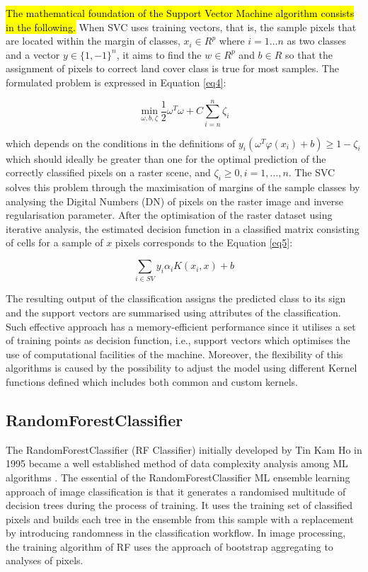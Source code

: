 \documentclass[final,5p,times,twocolumn]{elsarticle}
\begin{document}
\hl{The mathematical foundation of the Support Vector Machine algorithm consists in the following. }When SVC uses training vectors, that is, the sample pixels that are located within the margin of classes,
$x_{i} \in R^p$ where $ i=1 \dots n$ as two classes and a vector $y \in \{1, - 1\}^n$, it aims to find the $w \in R^p$ and $b \in R$ so that the assignment of pixels to correct land cover class is true for most samples. The formulated problem is expressed in Equation \ref{eq4}:

\begin{equation}
\min_{\omega,b,\zeta}\frac{1}{2}\omega^T\omega+C\sum_{i=n}^{n}\zeta_{i}
\label{eq4}
\end{equation}

which depends on the conditions in the definitions of $y_{i}(\omega^{T}\varphi (x_i) + b)\geq 1-\zeta_{i}$ which should ideally be greater than one for the optimal prediction of the correctly classified pixels on a raster scene, and $\zeta_{i}\geq 0, i = 1,\dots,n$. The SVC solves this problem through the maximisation of margins of the sample classes by analysing the Digital Numbers (DN) of pixels on the raster image and inverse regularisation parameter. After the optimisation of the raster dataset using iterative analysis, the estimated decision function in a classified matrix consisting of cells for a sample of $x$ pixels corresponds to the Equation \ref{eq5}:

\begin{equation}
\sum_{i\in SV}y_{i}\alpha_{i}K(x_{i},x) + b
\label{eq5}
\end{equation}

The resulting output of the classification assigns the predicted class to its sign and the support vectors are summarised using attributes of the classification. Such effective approach has a memory-efficient performance since it utilises a set of training points as decision function, i.e., support vectors which optimises the use of computational facilities of the machine. Moreover, the flexibility of this algorithms is caused by the possibility to adjust the model using different Kernel functions defined which includes both common and custom kernels. 
 
\subsection{RandomForestClassifier}

The RandomForestClassifier (RF Classifier) initially developed by Tin Kam Ho in 1995 \cite{598994} became a well established method of data complexity analysis among ML algorithms \cite{990132}. The essential of the RandomForestClassifier ML ensemble learning approach of image classification is that it generates a randomised multitude of decision trees during the process of training. It uses the training set of classified pixels and builds each tree in the ensemble from this sample with a replacement by introducing randomness in the classification workflow. In image processing, the training algorithm of RF uses the approach of bootstrap aggregating to analyses of pixels. 
\end{document}
